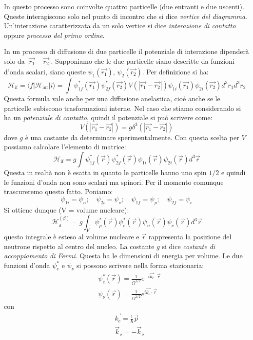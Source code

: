 In questo processo sono coinvolte quattro particelle (due entranti e due uscenti). Queste interagiscono solo nel punto di incontro che si dice \textit{vertice del diagramma}.
Un'interazione caratterizzata da un solo vertice si dice \textit{interazione di contatto} oppure \textit{processo del primo ordine}.

In un processo di diffusione di due particelle  il potenziale di interazione dipenderà solo da $|\vec{r_1}-\vec{r_2}|$. Supponiamo che le due particelle siano descritte da funzioni d'onda
scalari, siano queste $\psi_1(\vec{r_1})$, $\psi_2(\vec{r_2})$. Per definizione si ha:
\[
\mathcal{H}_{\text{if}}=\langle f|\mathcal{H}_{\text{int}}|i\rangle=\int \psi^*_{1f}(\vec{r_1})\psi^*_{2f}(\vec{r_2})V(|\vec{r_1}-\vec{r_2}|)\psi_{1i}(\vec{r_1})\psi_{2i}(\vec{r_2})d^3r_1d^3r_2
\]
Questa formula vale anche per una diffusione anelastica, cioé anche se le particelle subiscono trasformazioni interne. Nel caso che stiamo considerando si ha un \textit{potenziale di contatto},
quindi il potenziale si può scrivere come:
\[
V(|\vec{r_1}-\vec{r_2}|)=g\delta^3(|\vec{r_1}-\vec{r_2}|)
\]
dove $g$ è una costante da determinare sperimentalmente. Con questa scelta per $V$ possiamo calcolare l'elemento di matrice:
\[
\mathcal{H}_{\text{if}}=g\int \psi^*_{1f}(\vec{r})\psi^*_{2f}(\vec{r})\psi_{1i}(\vec{r})\psi_{2i}(\vec{r})d^3\vec{r}
\]
Questa in realtà non è esatta in quanto le particelle hanno uno spin $1/2$ e quindi le funzioni d'onda non sono scalari ma spinori. Per il momento comunque trascureremo questo fatto. Poniamo:
\[
\psi_{1i}=\psi_n;\quad\psi_{2i}=\psi_{\nu};\quad\psi_{1f}=\psi_p;\quad\psi_{2f}=\psi_e
\]
Si ottiene dunque (V = volume nucleare):
\[
\mathcal{H}_{\text{if}}^{(\beta)}=g\int_V\psi^*_p(\vec{r})\psi^*_e(\vec{r})\psi_n(\vec{r})\psi_{\nu}(\vec{r})d^3\vec{r}
\]
questo integrale è esteso al volume nucleare e $\vec{r}$ rappresenta la posizione del neutrone rispetto al centro del nucleo. La costante $g$ si dice \textit{costante di accoppiamento di Fermi}.
Questa ha le dimensioni di energia per volume. Le due funzioni d'onda $\psi^*_e$ e $\psi_{\nu}$ si possono scrivere nella forma stazionaria:
\begin{align*}
&\psi_e^*(\vec{r})=\frac{1}{\Omega^{1/2}}e^{-i\vec{k_e}\cdot\vec{r}}\\
&\psi_{\nu}(\vec{r})=\frac{1}{\Omega^{1/2}}e^{i\vec{k_{\nu}}\cdot\vec{r}}
\end{align*}
con
\begin{align*}
&\vec{k_e}=\frac{1}{\hbar}\vec{p}\\
&\vec{k}_{\nu}=-\vec{k}_{\bar{\nu}}
\end{align*}
